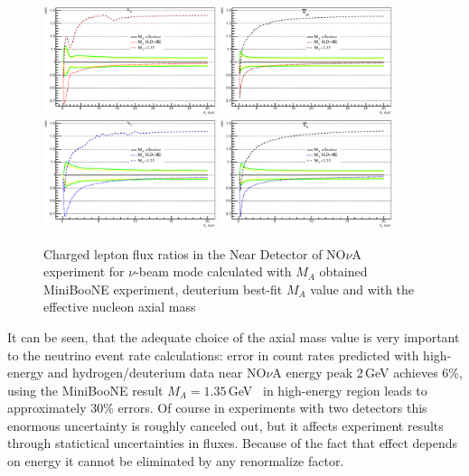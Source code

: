 \begin{figure}[htb!]
\begin{center}
\includegraphics[width=0.45\textwidth]{./NOvA/NOvA_newflux_Scintillator_nm_n5.eps}
\includegraphics[width=0.45\textwidth]{./NOvA/NOvA_newflux_Scintillator_am_n5.eps}
\includegraphics[width=0.45\textwidth]{./NOvA/NOvA_newflux_Scintillator_ne_n5.eps}
\includegraphics[width=0.45\textwidth]{./NOvA/NOvA_newflux_Scintillator_ae_n5.eps}
\caption{\label{NOvArates}Charged lepton flux ratios in the Near Detector of NO$\nu$A experiment for $\nu$-beam mode calculated with $M_{A}$ obtained MiniBooNE experiment, deuterium best-fit $M_{A}$ value and with the effective nucleon axial mass}
\end{center}
\end{figure}

It can be seen, that the adequate choice of the axial mass value is very important to the neutrino event rate calculations: error in count rates predicted with high-energy and hydrogen/deuterium data near NO$\nu$A energy peak 2\,GeV achieves 6\%, using the MiniBooNE result $M_{A}=1.35$\,GeV~\cite{AguilarArevalo:2010zc} in high-energy region leads to approximately 30\% errors. Of course in experiments with two detectors this enormous uncertainty is roughly canceled out, but it affects experiment results through statictical uncertainties in fluxes. Because of the fact that effect depends on energy it cannot be eliminated by any renormalize factor.

